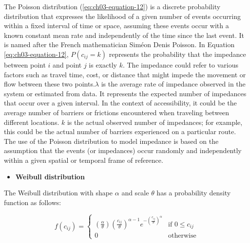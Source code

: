\documentclass[
11pt, %
oneside, %
english, %
singlespacing, %
]{macthesis} %
\def\tightlist{}
\begin{document}
The Poisson distribution (\ref{eq:ch03-equation-12}) is a discrete probability distribution that expresses the likelihood of a given number of events occurring within a fixed interval of time or space, assuming these events occur with a known constant mean rate and independently of the time since the last event. It is named after the French mathematician Siméon Denis Poisson. In Equation \ref{eq:ch03-equation-12}, \(P(c_{ij} =k)\) represents the probability that the impedance between point \(i\) and point \(j\) is exactly \(k\). The impedance could refer to various factors such as travel time, cost, or distance that might impede the movement or flow between these two points.\(\lambda\) is the average rate of impedance observed in the system or estimated from data. It represents the expected number of impedances that occur over a given interval. In the context of accessibility, it could be the average number of barriers or frictions encountered when traveling between different locations. \(k\) is the actual observed number of impedances; for example, this could be the actual number of barriers experienced on a particular route. The use of the Poisson distribution to model impedance is based on the assumption that the events (or impedances) occur randomly and independently within a given spatial or temporal frame of reference.

\begin{itemize}
\tightlist
\item
  \textbf{Weibull distribution}
\end{itemize}

The Weibull distribution with shape \(\alpha\) and scale \(\theta\) has a probability density function as follows:

\begin{equation}
f(c_{ij}) =
\begin{cases}
\left( \frac{\alpha}{\theta}\right) \left( \frac{c_{ij}}{\theta}\right)^{\alpha - 1} e^{-\left(\frac{c_{ij}}{\theta}\right)^\alpha} & \text{if } 0 \leq c_{ij} \\
0 & \text{otherwise}
\end{cases}
\label{eq:ch03-equation-13}
\end{equation}
\end{document}
